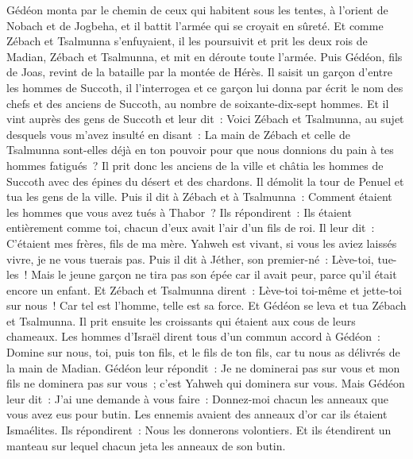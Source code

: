 \begin{multicols}{2}
Gédéon monta par le chemin de ceux qui habitent sous les tentes, à l'orient de Nobach et de Jogbeha, et il battit l'armée qui se croyait en sûreté.
Et comme Zébach et Tsalmunna s'enfuyaient, il les poursuivit et prit les deux rois de Madian, Zébach et Tsalmunna, et mit en déroute toute l'armée.
Puis Gédéon, fils de Joas, revint de la bataille par la montée de Hérès.
Il saisit un garçon d'entre les hommes de Succoth, il l'interrogea et ce garçon lui donna par écrit le nom des chefs et des anciens de Succoth, au nombre de soixante-dix-sept hommes.
Et il vint auprès des gens de Succoth et leur dit~: Voici Zébach et Tsalmunna, au sujet desquels vous m'avez insulté en disant~: La main de Zébach et celle de Tsalmunna sont-elles déjà en ton pouvoir pour que nous donnions du pain à tes hommes fatigués~?
Il prit donc les anciens de la ville et châtia les hommes de Succoth avec des épines du désert et des chardons.
Il démolit la tour de Penuel et tua les gens de la ville.
Puis il dit à Zébach et à Tsalmunna~: Comment étaient les hommes que vous avez tués à Thabor~? Ils répondirent~: Ils étaient entièrement comme toi, chacun d'eux avait l'air d'un fils de roi.
Il leur dit~: C'étaient mes frères, fils de ma mère. Yahweh est vivant, si vous les aviez laissés vivre, je ne vous tuerais pas.
Puis il dit à Jéther, son premier-né~: Lève-toi, tue-les~! Mais le jeune garçon ne tira pas son épée car il avait peur, parce qu'il était encore un enfant.
Et Zébach et Tsalmunna dirent~: Lève-toi toi-même et jette-toi sur nous~! Car tel est l'homme, telle est sa force. Et Gédéon se leva et tua Zébach et Tsalmunna. Il prit ensuite les croissants qui étaient aux cous de leurs chameaux.
Les hommes d'Israël dirent tous d'un commun accord à Gédéon~: Domine sur nous, toi, puis ton fils, et le fils de ton fils, car tu nous as délivrés de la main de Madian.
Gédéon leur répondit~: Je ne dominerai pas sur vous et mon fils ne dominera pas sur vous~; c'est Yahweh qui dominera sur vous.
Mais Gédéon leur dit~: J'ai une demande à vous faire~: Donnez-moi chacun les anneaux que vous avez eus pour butin. Les ennemis avaient des anneaux d'or car ils étaient Ismaélites.
Ils répondirent~: Nous les donnerons volontiers. Et ils étendirent un manteau sur lequel chacun jeta les anneaux de son butin.

\end{multicols}
